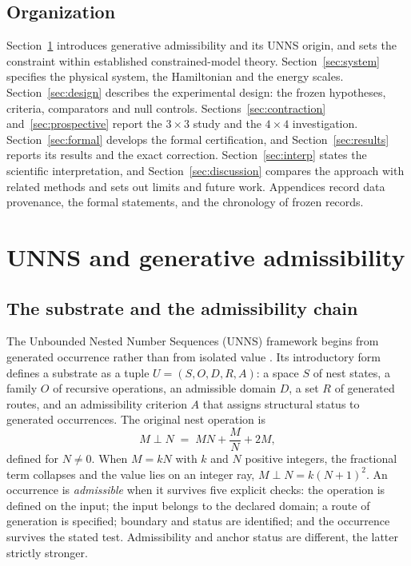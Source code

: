 \documentclass[11pt,a4paper]{article}
\theoremstyle{plain}
\theoremstyle{definition}
\theoremstyle{remark}
\begin{document}
\subsection{Organization}
Section~\ref{sec:unns} introduces generative admissibility and its UNNS origin, and sets the constraint within established constrained-model theory. Section~\ref{sec:system} specifies the physical system, the Hamiltonian and the energy scales. Section~\ref{sec:design} describes the experimental design: the frozen hypotheses, criteria, comparators and null controls. Sections~\ref{sec:contraction} and~\ref{sec:prospective} report the $3\times3$ study and the $4\times4$ investigation. Section~\ref{sec:formal} develops the formal certification, and Section~\ref{sec:results} reports its results and the exact correction. Section~\ref{sec:interp} states the scientific interpretation, and Section~\ref{sec:discussion} compares the approach with related methods and sets out limits and future work. Appendices record data provenance, the formal statements, and the chronology of frozen records.

\section{UNNS and generative admissibility}\label{sec:unns}

\subsection{The substrate and the admissibility chain}
The Unbounded Nested Number Sequences (UNNS) framework begins from generated occurrence rather than from isolated value \cite{UNNSIntro2026}. Its introductory form defines a substrate as a tuple $U=(S,O,D,R,A)$: a space $S$ of nest states, a family $O$ of recursive operations, an admissible domain $D$, a set $R$ of generated routes, and an admissibility criterion $A$ that assigns structural status to generated occurrences. The original nest operation is
\[
M\perp N \;=\; MN+\frac{M}{N}+2M ,
\]
defined for $N\neq0$. When $M=kN$ with $k$ and $N$ positive integers, the fractional term collapses and the value lies on an integer ray, $M\perp N=k(N+1)^2$. An occurrence is \emph{admissible} when it survives five explicit checks: the operation is defined on the input; the input belongs to the declared domain; a route of generation is specified; boundary and status are identified; and the occurrence survives the stated test. Admissibility and anchor status are different, the latter strictly stronger.
\end{document}

